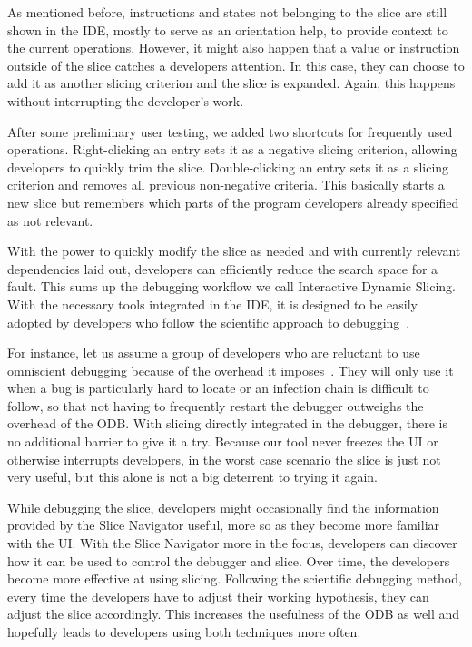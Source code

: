 \documentclass[
			english,
			]{elsarticle}
\begin{document}
As mentioned before, instructions and states not belonging to the slice are still shown in the IDE, mostly to serve as an orientation help, to provide context to the current operations.
However, it might also happen that a value or instruction outside of the slice catches a developers attention.
In this case, they can choose to add it as another slicing criterion and the slice is expanded.
Again, this happens without interrupting the developer's work.

After some preliminary user testing, we added two shortcuts for frequently used operations.
Right-clicking an entry sets it as a negative slicing criterion, allowing developers to quickly trim the slice. 
Double-clicking an entry sets it as a slicing criterion and removes all previous non-negative criteria.
This basically starts a new slice but remembers which parts of the program developers already specified as not relevant.

With the power to quickly modify the slice as needed and with currently relevant dependencies laid out, developers can efficiently reduce the search space for a fault.
This sums up the debugging workflow we call Interactive Dynamic Slicing.
With the necessary tools integrated in the IDE, it is designed to be easily adopted by developers who follow the scientific approach to debugging~\cite{araki91:a_general_framework}.

For instance, let us assume a group of developers who are reluctant to use omniscient debugging because of the overhead it imposes~\cite{lewis_debugging_2003, pothier_scalable_2007, perscheid_studying_2017}.
They will only use it when a bug is particularly hard to locate or an infection chain is difficult to follow, so that not having to frequently restart the debugger outweighs the overhead of the ODB.
With slicing directly integrated in the debugger, there is no additional barrier to give it a try.
Because our tool never freezes the UI or otherwise interrupts developers, in the worst case scenario the slice is just not very useful, but this alone is not a big deterrent to trying it again.

While debugging the slice, developers might occasionally find the information provided by the Slice Navigator useful, more so as they become more familiar with the UI.
With the Slice Navigator more in the focus, developers can discover how it can be used to control the debugger and slice.
Over time, the developers become more effective at using slicing.
Following the scientific debugging method, every time the developers have to adjust their working hypothesis, they can adjust the slice accordingly.
This increases the usefulness of the ODB as well and hopefully leads to developers using both techniques more often.
\end{document}
